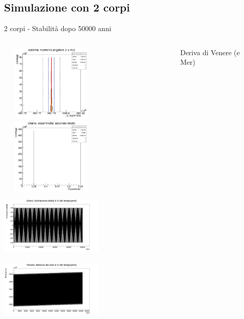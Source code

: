    \subsection[Sim]{Simulazione con 2 corpi}
        \begin{frame}{2 corpi - Stabilità dopo 50000 anni}
            \begin{columns}
                    \centering        
                    \includegraphics[width=5cm,height=3.75cm]{13_2cc/ura_Ltot.jpg}\\
                    \includegraphics[width=5cm,height=3.75cm]{13_2cc/ura_ecc.jpg}
                    \label{cfr::vin}              
                    \centering        
                    \includegraphics[width=5cm,height=3.25cm]{13_2cc/ura_teta_tempo.jpg}\\
                    \includegraphics[width=5cm,height=3.25cm]{13_2cc/ven_drift.jpg}
                    \caption{Deriva di Venere (e Mer)}
                    \label{cfr::sdf}
            \end{columns}
        \end{frame}